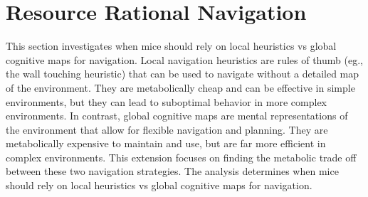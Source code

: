 \section{Resource Rational Navigation}

This section investigates when mice should rely on local heuristics vs global cognitive maps for navigation. Local navigation heuristics are rules of thumb (eg., the wall touching heuristic) that can be used to navigate without a detailed map of the environment. They are metabolically cheap and can be effective in simple environments, but they can lead to suboptimal behavior in more complex environments. In contrast, global cognitive maps are mental representations of the environment that allow for flexible navigation and planning. They are metabolically expensive to maintain and use, but are far more efficient in complex environments.
This extension focuses on finding the metabolic trade off between these two navigation strategies. The analysis determines when mice should rely on local heuristics vs global cognitive maps for navigation.
